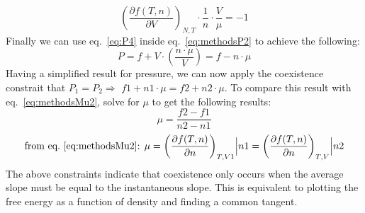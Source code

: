 \begin{equation}\label{eq:P4}
\left(\frac{\partial f(T,n)}{\partial V}\right)_{N,T} \cdot \frac{1}{n} \cdot \frac{V}{\mu}=-1
\end{equation}
Finally we can use eq.~\ref{eq:P4} inside eq.~\ref{eq:methodsP2} to achieve the following:
\begin{equation}\label{eq:P5}
P=f+V\cdot\left( \frac{n\cdot \mu}{V} \right)=f-n\cdot\mu
\end{equation}
Having a simplified result for pressure, we can now apply the coexistence constrait that $P_1=P_2 \Rightarrow$ $f1+n1\cdot\mu=f2+n2\cdot\mu$. To compare this result with eq.~\ref{eq:methodsMu2}, solve for $\mu$ to get the following results:
\begin{equation}\label{eq:mu3p}
\mu=\frac{f2-f1}{n2-n1}
\end{equation}
\begin{equation}\label{eq:mu3}
\text{from eq.~\ref{eq:methodsMu2}: }\mu= \left(\frac{\partial f(T,n)}{\partial n}\right)_{T,V1}\Bigr|n1=\left(\frac{\partial f(T,n)}{\partial n}\right)_{T,V}\Bigr|n2
\end{equation}
The above constraints indicate that coexistence only occurs when the average slope must be equal to the instantaneous slope. This is equivalent to plotting the free energy as a function of density and finding a common tangent.


